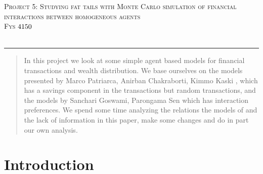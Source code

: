 \documentclass[a4paper,11pt]{article}
\newcommand*{\boisik}{\fontfamily{bsk}\selectfont} %
\begin{document}
{
\SetBgVshift{-1.2cm}
\SetBgHshift{-10.5cm}
$$\:$$
\begin{center}
	\vspace{0.2cm}%
	\fontsize{15}{15}\selectfont \textsc{ Project 5: Studying fat tails with Monte Carlo simulation of financial interactions between homogeneous agents}\\
	\fontsize{13}{13}\selectfont \textsc{Fys $\textnormal{{4150}}$ }\\
	\vspace{0.4cm}
	\fontsize{12}{12}\\
	\vspace{0.5cm}
\end{center}
	
\rule{\textwidth}{0.3pt}\par
		
\begin{abstract}
	In this project we look at some simple agent based models for financial transactions and wealth distribution. We base ourselves on the models presented by Marco Patriarca, Anirban Chakraborti, Kimmo Kaski \cite{GibbsVsnon-Gibbs}, which has a savings component in the transactions but random transactions, and the models by Sanchari Goswami, Parongama Sen \cite{AgentBasedModels} which has interaction preferences. We spend some time analyzing the relations the models of \cite{AgentBasedModels} and the lack of information in this paper, make some changes and do in part our own analysis.
	
\end{abstract}



		
\section*{Introduction}

}
\end{document}

